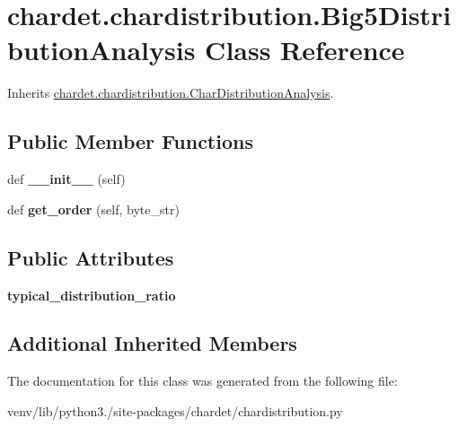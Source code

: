 \hypertarget{classchardet_1_1chardistribution_1_1_big5_distribution_analysis}{}\section{chardet.\+chardistribution.\+Big5\+Distribution\+Analysis Class Reference}
\label{classchardet_1_1chardistribution_1_1_big5_distribution_analysis}


Inherits \hyperlink{classchardet_1_1chardistribution_1_1_char_distribution_analysis}{chardet.\+chardistribution.\+Char\+Distribution\+Analysis}.

\subsection*{Public Member Functions}
\begin{DoxyCompactItemize}
\item 
\mbox{\label{classchardet_1_1chardistribution_1_1_big5_distribution_analysis_ae1ff82652624014208f125c995ef16af}} 
def {\bfseries \+\_\+\+\_\+init\+\_\+\+\_\+} (self)
\item 
\mbox{\label{classchardet_1_1chardistribution_1_1_big5_distribution_analysis_afe0c8117b741f02178e2218797abf92c}} 
def {\bfseries get\+\_\+order} (self, byte\+\_\+str)
\end{DoxyCompactItemize}
\subsection*{Public Attributes}
\begin{DoxyCompactItemize}
\item 
\mbox{\label{classchardet_1_1chardistribution_1_1_big5_distribution_analysis_a3b56891331bdfd14ee1cb509dee098c7}} 
{\bfseries typical\+\_\+distribution\+\_\+ratio}
\end{DoxyCompactItemize}
\subsection*{Additional Inherited Members}


The documentation for this class was generated from the following file\+:\begin{DoxyCompactItemize}
\item 
venv/lib/python3./site-\/packages/chardet/chardistribution.\+py\end{DoxyCompactItemize}
